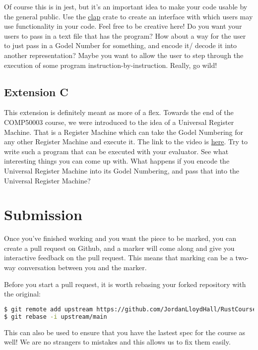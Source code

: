 \documentclass{report}
\begin{document}
Of course this is in jest, but it's an important idea to make your code usable by
the general public.
Use the \href{https://github.com/clap-rs/clap}{clap} crate to create an interface
with which users may use functionality in your code. Feel free to be creative here!
Do you want your users to pass in a text file that has the program? How about a way
for the user to just pass in a Godel Number for something, and encode it/
decode it into another representation? Maybe you want to allow the user to step 
through the execution of some program instruction-by-instruction. Really, go wild!

\subsection*{Extension C}
This extension is definitely meant as more of a flex. Towards the end of the
COMP50003 course, we were introduced to the idea of a Universal Register Machine.
That is a Register Machine which can take the Godel Numbering for any other Register
Machine and execute it. The link to the video is 
\href{https://imperial.cloud.panopto.eu/Panopto/Pages/Viewer.aspx?id=d3732fc3-0d12-40be-9e41-aded00929300}{here}.
Try to write such a program that can be executed with your evaluator. See what interesting
things you can come up with. What happens if you encode the Universal Register Machine
into its Godel Numbering, and pass that into the Universal Register Machine?

\section*{Submission}
Once you've finished working and you want the piece to be marked, you can create 
a pull request on Github, and a marker will come along and give you interactive
feedback on the pull request. This means that marking can be a two-way conversation
between you and the marker.

Before you start a pull request, it is worth rebasing your forked repository with
the original:
\begin{lstlisting}[language=Bash]
$ git remote add upstream https://github.com/JordanLloydHall/RustCourse
$ git rebase -i upstream/main
\end{lstlisting}

This can also be used to ensure that you have the lastest spec for the course as well! 
We are no strangers to mistakes and this allows us to fix them easily.
\end{document}
